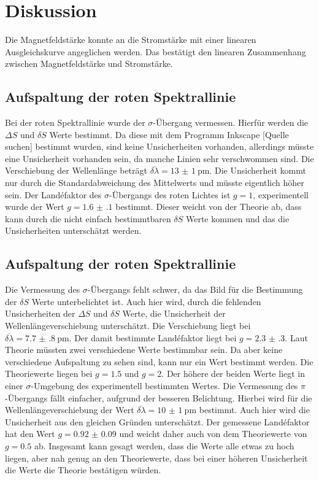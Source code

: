 \section{Diskussion}
Die Magnetfeldstärke konnte an die Stromstärke mit einer linearen Ausgleichskurve angeglichen werden. 
Das bestätigt den linearen Zusammenhang zwischen Magnetfeldstärke und Stromstärke.
\subsection{Aufspaltung der roten Spektrallinie}
Bei der roten Spektrallinie wurde der $\sigma$-Übergang vermessen. Hierfür werden die $\Delta S$ und $\delta S$ 
Werte bestimmt. Da diese mit dem Programm Inkscape [Quelle suchen] bestimmt wurden, sind keine Unsicherheiten vorhanden, allerdings 
müsste eine Unsicherheit vorhanden sein, da manche Linien sehr verschwommen sind. Die Verschiebung der Wellenlänge 
beträgt $\overline{\delta\lambda} = \SI{13(1)}{\pico\meter}$. Die Unsicherheit kommt nur durch die Standardabweichung des 
Mittelwerts und müsste eigentlich höher sein.
Der Landéfaktor des $\sigma$-Übergangs des roten Lichtes ist $g=1$, experimentell wurde der Wert $g=\num{1.6(1)}$ 
bestimmt. Dieser weicht von der Theorie ab, dass kann durch die nicht einfach bestimmtbaren $\delta S$ Werte kommen und 
das die Unsicherheiten unterschätzt werden.
\subsection{Aufspaltung der roten Spektrallinie}
Die Vermessung des $\sigma$-Übergangs fehlt schwer, da das Bild für die Bestimmung der $\delta S$ Werte unterbelichtet ist.
Auch hier wird, durch die fehlenden Unsicherheiten der $\Delta S$ und $\delta S$ Werte, die Unsicherheit der 
Wellenlängeverschiebung unterschätzt. Die Verschiebung liegt bei $\overline{\delta\lambda} = \SI{7.7(8)}{\pico\meter}$.
Der damit bestimmte Landéfaktor liegt bei $g=\num{2.3(3)}$. Laut Theorie müssten zwei verschiedene Werte bestimmbar sein.
Da aber keine verschiedene Aufspaltung zu sehen sind, kann nur ein Wert bestimmt werden. Die Theoriewerte liegen bei 
$g=\num{1.5}$ und $g=2$. Der höhere der beiden Werte liegt in einer $\sigma$-Umgebung des experimentell bestimmten Wertes.
Die Vermessung des $\pi$-Übergangs fällt einfacher, aufgrund der besseren Belichtung.
Hierbei wird für die Wellenlängeverschiebung der Wert $\overline{\delta\lambda} = \SI{10(1)}{\pico\meter}$ bestimmt. 
Auch hier wird die Unsicherheit aus den gleichen Gründen unterschätzt.
Der gemessene Landéfaktor hat den Wert $g=\num{0.92(9)}$ und weicht daher auch von dem Theoriewerte von $g=\num{0.5}$ ab.
Insgesamt kann gesagt werden, dass die Werte alle etwas zu hoch liegen, aber nah genug an den Theoriewerte, dass bei einer 
höheren Unsicherheit die Werte die Theorie bestätigen würden. 